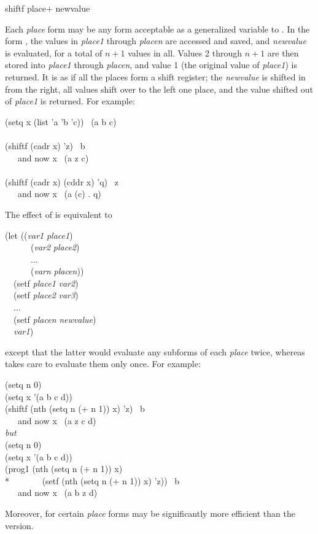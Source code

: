 \begin{defmac}
shiftf {place}+ newvalue

Each \textit{place} form may be any form acceptable
as a generalized variable to .
In the form ,
the values in \textit{place1} through \textit{placen} are accessed and saved,
and \textit{newvalue} is evaluated, for a total of $\textit{n}+1$ values in all.
Values 2 through $\textit{n}+1$ are then stored into \textit{place1} through \textit{placen},
and value 1 (the original value of \textit{place1}) is returned.
It is as if all the places form a shift register; the \textit{newvalue}
is shifted in from the right, all values shift over to the left one place,
and the value shifted out of \textit{place1} is returned.  For example:
\begin{lisp}
(setq x (list 'a 'b 'c)) \EV\ (a b c) \\
 \\
(shiftf (cadr x) 'z) \EV\ b \\
~~~{\rm and now} x \EV\ (a z c) \\
 \\
(shiftf (cadr x) (cddr x) 'q) \EV\ z \\
~~~{\rm and now} x \EV\ (a (c) . q)
\end{lisp}
The effect of 
is equivalent to
\begin{lisp}
(let ((\textit{var1} \textit{place1}) \\
~~~~~~(\textit{var2} \textit{place2}) \\
~~~~~~... \\
~~~~~~(\textit{varn} \textit{placen})) \\
~~(setf \textit{place1} \textit{var2}) \\
~~(setf \textit{place2} \textit{var3}) \\
~~... \\
~~(setf \textit{placen} \textit{newvalue}) \\
~~\textit{var1})
\end{lisp}
except that the latter would evaluate any subforms of each \textit{place} twice,
whereas  takes care to evaluate them only once.
For example:
\begin{lisp}
(setq n 0) \\
(setq x '(a b c d)) \\
(shiftf (nth (setq n (+ n 1)) x) 'z) \EV\ b \\
~~~{\rm and now} x \EV\ (a z c d) \\[4pt]
\textit{but} \\[4pt]
(setq n 0) \\
(setq x '(a b c d)) \\
(prog1 (nth (setq n (+ n 1)) x) \\*
~~~~~~~(setf (nth (setq n (+ n 1)) x) 'z)) \EV\ b \\
~~~{\rm and now} x \EV\ (a b z d)
\end{lisp}
Moreover, for certain \textit{place} forms  may be
significantly more efficient than the  version.


\end{defmac}
